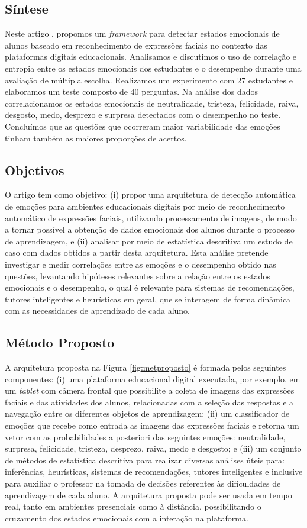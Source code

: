 \subsection{Síntese}
Neste artigo \citep{cruz2017framework}, propomos um \textit{framework} para detectar estados emocionais de alunos baseado em reconhecimento de expressões faciais no contexto das plataformas digitais educacionais. Analisamos e discutimos o uso de correlação e entropia entre os estados emocionais dos estudantes e o desempenho durante uma avaliação de múltipla escolha. Realizamos um experimento com 27 estudantes e elaboramos um teste composto de 40 perguntas. Na análise dos dados correlacionamos os estados emocionais de neutralidade, tristeza, felicidade, raiva, desgosto, medo, desprezo e surpresa detectados com o desempenho no teste. Concluímos que as questões que ocorreram maior variabilidade das emoções tinham também as maiores proporções de acertos.

\subsection{Objetivos}
O artigo \citep{cruz2017framework} tem como objetivo: (i) propor uma arquitetura de detecção automática de emoções para ambientes educacionais digitais por meio de reconhecimento automático de expressões faciais, utilizando processamento de imagens, de modo a tornar possível a obtenção de dados emocionais dos alunos durante o processo de aprendizagem, e (ii) analisar por meio de estatística descritiva um estudo de caso com dados obtidos a partir desta arquitetura. Esta análise pretende investigar e medir correlações entre as emoções e o desempenho obtido nas questões, levantando hipóteses relevantes sobre a relação entre os estados emocionais e o desempenho, o qual é relevante para sistemas de recomendações, tutores inteligentes e heurísticas em geral, que se interagem de forma dinâmica com as necessidades de aprendizado de cada aluno.

\subsection{Método Proposto}
A arquitetura proposta na Figura \ref{fig:metproposto} é formada pelos seguintes componentes: (i) uma plataforma educacional digital executada, por exemplo, em um \textit{tablet} com câmera frontal que possibilite a coleta de imagens das expressões faciais e das atividades dos alunos, relacionadas com a seleção das respostas e a navegação entre os diferentes objetos de aprendizagem; (ii) um classificador de emoções que recebe como entrada as imagens das expressões faciais e retorna um vetor com as probabilidades a posteriori das seguintes emoções: neutralidade, surpresa, felicidade, tristeza, desprezo, raiva, medo e desgosto; e (iii) um conjunto de métodos de estatística descritiva para realizar diversas análises úteis para: inferências, heurísticas, sistemas de recomendações, tutores inteligentes e inclusive para auxiliar o professor na tomada de decisões referentes às dificuldades de aprendizagem de cada aluno. A arquitetura proposta pode ser usada em tempo real, tanto em ambientes presenciais como à distância, possibilitando o cruzamento dos estados emocionais com a interação na plataforma.

